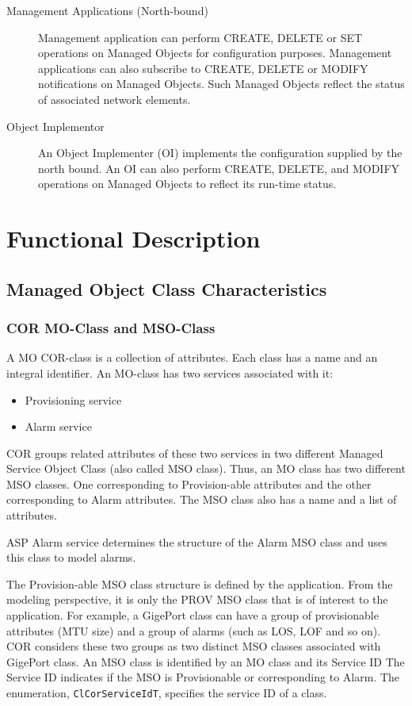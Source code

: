 \begin{flushleft}
\begin{description}
\item
[Management Applications (North-bound)]
Management application can perform CREATE, DELETE or SET operations on Managed Objects for configuration purposes. Management applications can also subscribe
to CREATE, DELETE or MODIFY notifications on Managed Objects. Such Managed Objects reflect the status of associated network elements.

\item[Object Implementor]
An Object Implementer (OI) implements the configuration supplied by the north bound. An OI can also perform CREATE, DELETE, and MODIFY operations 
on Managed Objects to reflect its run-time status. 

\end{description}
\section{Functional Description}
\subsection{Managed Object Class Characteristics}
\subsubsection{COR MO-Class and MSO-Class}

A MO COR-class is a collection of attributes. Each class has a name and an integral identifier. An MO-class has two services associated with it:
\begin{itemize}
\item
Provisioning service 
\item
Alarm service
\end{itemize}

COR groups related attributes of these two services in two different Managed Service Object Class (also called MSO class).
Thus, an MO class has two different MSO classes. One corresponding to Provision-able attributes and the other corresponding to Alarm 
attributes. The MSO class also has a name and a list of attributes.
\par
ASP Alarm service determines the structure of the Alarm MSO class and uses this class to model alarms. 
\par
The Provision-able MSO class structure is defined by the application. From the modeling perspective, it is only the PROV MSO class that is of interest 
to the application. For example, a GigePort class can have a group of provisionable attributes (MTU size) and a group of alarms (such as LOS, LOF
and so on).
COR considers these two groups as two distinct MSO classes associated with GigePort class. An MSO class is identified by an MO class and its Service ID 
The Service ID indicates if the MSO is Provisionable or corresponding to Alarm. The enumeration, {\tt{ClCorServiceIdT}}, specifies the service ID of a class.


\end{flushleft}
